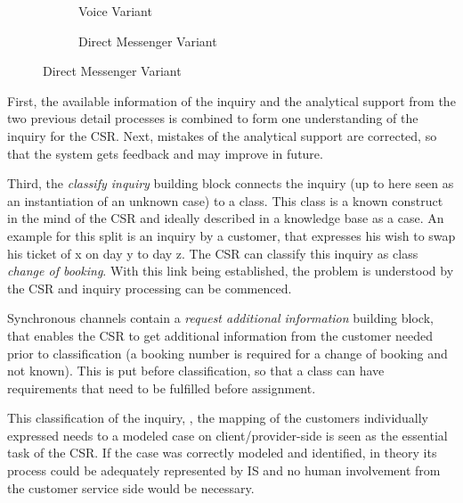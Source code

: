 \begin{figure}[caption={Classify Inquiry Detail Process}, label={fig:inbound:class}]
\begin{subfigure}[b]{.45\textwidth}
\begin{tikzpicture}
	 		
	 		\end{tikzpicture}
	 		\caption{Voice Variant}\label{fig:inbound:class:voice}
	 	\end{subfigure}
	 	\begin{subfigure}[b]{.45\textwidth}
	 		\centering	
	 		\caption{Direct Messenger Variant}\label{fig:inbound:class:dm}
	 	\end{subfigure}
	 \end{figure}
	 
	 First, the available information of the inquiry and the analytical support from the two previous detail processes is combined to form one understanding of the inquiry for the \acrshort{CSR}. Next, mistakes of the analytical support are corrected, so that the system gets feedback and may improve in future.
	 
	 Third, the \textit{classify inquiry} building block connects the inquiry (up to here seen as an instantiation of an unknown case) to a class. This class is a known construct in the mind of the \acrfull{CSR} and ideally described in a knowledge base as a case. An example for this split is an inquiry by a customer, that expresses his wish to swap his ticket of x on day y to day z. The \acrshort{CSR} can classify this inquiry as class \textit{change of booking}. With this link being established, the problem is understood by the  \acrshort{CSR} and inquiry processing can be commenced. 
	 
	 Synchronous channels contain a \textit{request additional information} building block, that enables the \acrshort{CSR} to get additional information from the customer needed prior to classification (a booking number is required for a change of booking and not known). This is put before classification, so that a class can have requirements that need to be fulfilled before assignment. 
	 
	 This classification of the inquiry, \ie, the mapping of the customers individually expressed needs to a modeled case on client/provider-side is seen as the essential task of the \acrshort{CSR}. If the case was correctly modeled and identified, in theory its process could be adequately represented by \acrshort{IS} and no human involvement from the customer service side would be necessary. 
	 
